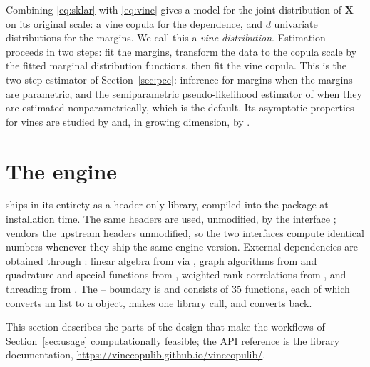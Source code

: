 \documentclass[article]{jss}
\begin{document}
Combining \eqref{eq:sklar} with \eqref{eq:vine} gives a model for the joint
distribution of $\mathbf{X}$ on its original scale: a vine copula for the
dependence, and $d$ univariate distributions for the margins.  We call this a
\emph{vine distribution}.  Estimation proceeds in two steps: fit the margins,
transform the data to the copula scale by the fitted marginal distribution
functions, then fit the vine copula.  This is the two-step estimator of Section~\ref{sec:pcc}: inference for margins
\citep{joe1996ifm, joe2005} when the margins are parametric, and the
semiparametric pseudo-likelihood estimator of \citet{genest1995} when they are
estimated nonparametrically, which is the default.  Its asymptotic properties
for vines are studied by \citet{haff2013} and, in growing dimension, by
\citet{gauss2025}.

\section[The vinecopulib engine]{The  engine}\label{sec:engine}

 ships  in its entirety as a header-only
 library, compiled into the package at installation time.  The
same headers are used, unmodified, by the  interface
 \citep{pyvinecopulib};  vendors the upstream headers unmodified, so the two
interfaces compute identical numbers whenever they ship the same engine
version.  External dependencies are obtained
through : linear algebra from  \citep{eigen} via
 \citep{bates2013}, graph algorithms from  \citep{siek2002} and quadrature and
special functions from , weighted rank correlations from
 \citep{wdm},
and threading from  \citep{RcppThread}.  The --%
 boundary is  \citep{eddelbuettel2011} and consists of
35 functions, each of which converts an  list to a
 object, makes one library call, and converts back.

This section describes the parts of the design that make the workflows of
Section~\ref{sec:usage} computationally feasible; the API reference is the
library documentation, \url{https://vinecopulib.github.io/vinecopulib/}.
\end{document}
